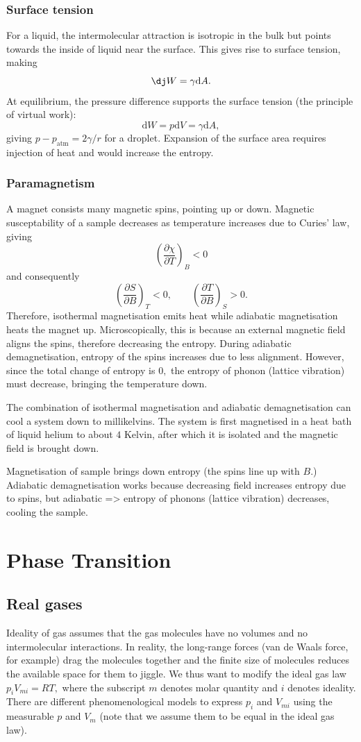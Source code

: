 \documentclass{article}
\theoremstyle{nonumberplain}
\begin{document}
\subsubsection{Surface tension}
For a liquid, the intermolecular attraction is isotropic in the bulk but points towards the inside of liquid near the surface. This gives rise to surface tension, making 
\[
    \mathrm{\dj} W = \gamma \mathrm{d} A. 
\]
At equilibrium, the pressure difference supports the surface tension (the principle of virtual work):
\[
    \mathrm{d} W = p \mathrm{d} V = \gamma \mathrm{d} A,
    \] 
giving $p - p_{\mathrm{atm} } = 2\gamma /r$ for a droplet. Expansion of the surface area requires injection of heat and would increase the entropy.

\subsubsection{Paramagnetism}
A magnet consists many magnetic spins, pointing up or down. Magnetic susceptability of a sample decreases as temperature increases due to Curies' law, giving 
\[
    \left( \frac{\partial \chi }{\partial T} \right)_{B} < 0
\]
and consequently
\[
    \left( \frac{\partial S}{\partial B} \right)_{T} < 0, \qquad
    \left( \frac{\partial T}{\partial B} \right)_{S} > 0. 
\]
Therefore, isothermal magnetisation emits heat while adiabatic magnetisation heats the magnet up. Microscopically, this is because an external magnetic field aligns the spins, therefore decreasing the entropy. During adiabatic demagnetisation, entropy of the spins increases due to less alignment. However, since the total change of entropy is $0,$ the entropy of phonon (lattice vibration) must decrease, bringing the temperature down.

The combination of isothermal magnetisation and adiabatic demagnetisation can cool a system down to millikelvins. The system is first magnetised in a heat bath of liquid helium to about $4$ Kelvin, after which it is isolated and the magnetic field is brought down. 

Magnetisation of sample brings down entropy (the spins line up with $B$.) Adiabatic demagnetisation works because decreasing field increases entropy due to spins, but adiabatic => entropy of phonons (lattice vibration) decreases, cooling the sample. 
\section{Phase Transition}
\subsection{Real gases}
Ideality of gas assumes that the gas molecules have no volumes and no intermolecular interactions. In reality, the long-range forces (van de Waals force, for example) drag the molecules together and the finite size of molecules reduces the available space for them to jiggle. We thus want to modify the ideal gas law $p_i V_{mi} = R T,$ where the subscript $m$ denotes molar quantity and $i$ denotes ideality. There are different phenomenological models to express $p_i$ and $V_{mi}$ using the measurable $p$ and $V_m$ (note that we assume them to be equal in the ideal gas law). 
\end{document}
